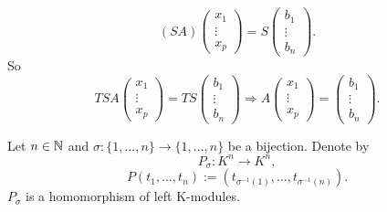 \documentclass{book}
\numberwithin{equation}{section}
\begin{document}
\begin{proofenv}
     \begin{equation*}
        (SA)\begin{pmatrix}
        x_1\\
        \vdots\\
        x_p
        \end{pmatrix}=S\begin{pmatrix}
        b_1\\
        \vdots\\
        b_n
        \end{pmatrix}.
    \end{equation*}
    So 
     \begin{equation*}
        TSA\begin{pmatrix}
        x_1\\
        \vdots\\
        x_p
        \end{pmatrix}=TS\begin{pmatrix}
        b_1\\
        \vdots\\
        b_n
        \end{pmatrix}
        \Rightarrow
        A\begin{pmatrix}
        x_1\\        
        \vdots\\
        x_p
        \end{pmatrix}=\begin{pmatrix}
        b_1\\
        \vdots\\
        b_n
        \end{pmatrix}.
    \end{equation*}
\end{proofenv}
\begin{definitionenv}
    Let $n\in\mathbb{N}$ and $\sigma:\{1,\dots,n\}\rightarrow\{1,\dots,n\}$ be a bijection. Denote by 
    $$P_\sigma:K^n\longrightarrow K^n,$$
    $$P(t_1,\dots,t_n):=\left(t_{\sigma^{-1}(1)},\dots,t_{\sigma^{-1}(n)}\right).$$
    $P_\sigma$ is a homomorphism of left K-modules.
\end{definitionenv}
\end{document}
